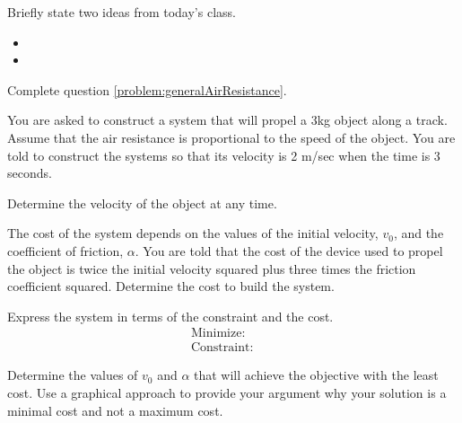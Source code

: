\postClass

\begin{problem}
\item Briefly state two ideas from today's class.
  \begin{itemize}
  \item
  \item
  \end{itemize}
\item Complete question \ref{problem:generalAirResistance}.
  \clearpage

\item You are asked to construct a system that will propel a 3kg
  object along a track. Assume that the air resistance is proportional
  to the speed of the object. You are told to construct the systems so
  that its velocity is 2 m/sec when the time is 3 seconds.
  \begin{subproblem}
  \item Determine the velocity of the object at any time.

    \vfill

  \item The cost of the system depends on the values of the initial
    velocity, $v_0$, and the coefficient of friction, $\alpha$. You
    are told that the cost of the device used to propel the object is
    twice the initial velocity squared plus three times the
    friction coefficient squared. Determine the cost to build
    the system.

    \vfill

  \item Express the system in terms of the constraint and the cost.
  \begin{eqnarray*}
    \mathrm{Minimize:}  & &  \\
    \mathrm{Constraint:}  & &
  \end{eqnarray*}
  \item Determine the values of $v_0$ and $\alpha$ that will achieve
    the objective with the least cost. Use a graphical approach to provide
    your argument why your solution is a minimal cost and not a maximum cost.
    \vfill
  \end{subproblem}
\end{problem}



